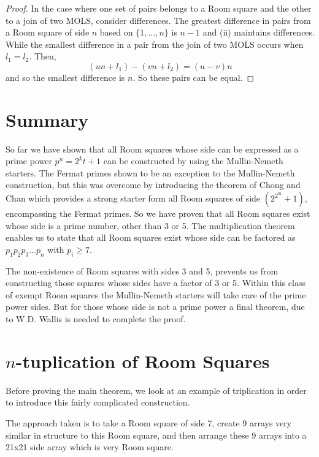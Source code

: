\documentclass[11pt, a4paper]{book}\usepackage[]{graphicx}\usepackage[]{xcolor}
\newcounter{example}
\begin{document}
\begin{proof}
In the case where one set of pairs belongs to a Room square
and the other to a join of two MOLS, consider differences.
The greatest difference in pairs from a Room square of side
$n$ based on $\{1, \ldots, n\}$ is $n - 1$ and (ii)
maintains differences. While the smallest difference in a
pair from the join of two MOLS occurs when $l_1 = l_2$.
Then,
\begin{equation}
  (un + l_1) - (vn + l_2) = (u - v)n
\end{equation}
and so the smallest difference is $n$. So these pairs can
be equal.
\end{proof}

\section{Summary}

So far we have shown that all Room squares whose side can be
expressed as a prime power $p^n = 2^kt + 1$ can be constructed
by using the Mullin-Nemeth starters. The Fermat primes shown
to be an exception to the Mullin-Nemeth construction, but
this was overcome by introducing the theorem of Chong and
Chan which provides a strong starter form all Room squares
of side $(2^{2^m} + 1)$, encompassing the Fermat primes. So we
have proven that all Room squares exist whose side is a
prime number, other than 3 or 5. The multiplication theorem
enables us to state that all Room squares exist whose side
can be factored as $p_1p_2p_3...p_n$ with $p_i \geq 7$.

The non-existence of Room squares with sides 3 and 5,
prevents us from constructing those squares whose sides have
a factor of 3 or 5. Within this class of exempt Room squares
the Mullin-Nemeth starters will take care of the prime
power sides. But for those whose side is not a prime power a
final theorem, due to W.D. Wallis is needed to complete the
proof.

\section{$n$-tuplication of Room Squares}

Before proving the main theorem, we look at an example of
triplication in order to introduce this fairly complicated
construction.

The approach taken is to take a Room square
of side 7, create 9 arrays very similar in structure to this
Room square, and then arrange these 9 arrays into a 21x21
side array which is very Room square.  
\end{document}
